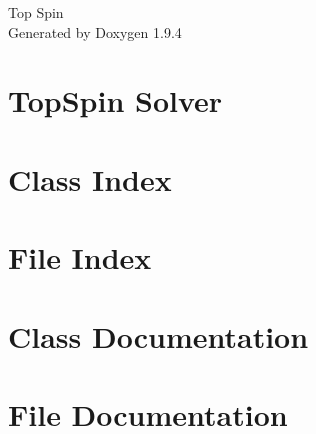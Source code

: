 \documentclass[twoside]{book}
\newcommand{\+}{\discretionary{\mbox{\scriptsize$\hookleftarrow$}}{}{}}
\newcommand{\clearemptydoublepage}{%
    \newpage{\pagestyle{empty}\cleardoublepage}%
  }
\begin{document}
  \raggedbottom
    \hypersetup{pageanchor=false,
                bookmarksnumbered=true,
                pdfencoding=unicode
               }
  \begin{titlepage}
  \vspace*{7cm}
  \begin{center}%
  {\Large Top Spin}\\
  \vspace*{1cm}
  {\large Generated by Doxygen 1.9.4}\\
  \end{center}
  \end{titlepage}
  \clearemptydoublepage
  \tableofcontents
  \clearemptydoublepage
  \hypersetup{pageanchor=true}
\chapter{Top\+Spin Solver}
\label{md_README}

\chapter{Class Index}

\chapter{File Index}

\chapter{Class Documentation}



\chapter{File Documentation}

  \backmatter
  \newpage
  \clearemptydoublepage
  \printindex
\end{document}
